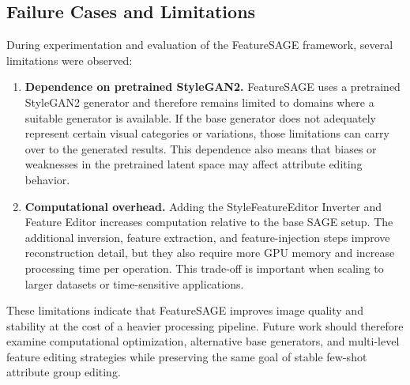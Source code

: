 \subsection{Failure Cases and Limitations}

During experimentation and evaluation of the FeatureSAGE framework, several limitations were observed:

\begin{enumerate}
    \item \textbf{Dependence on pretrained StyleGAN2.} FeatureSAGE uses a pretrained StyleGAN2 generator and therefore remains limited to domains where a suitable generator is available. If the base generator does not adequately represent certain visual categories or variations, those limitations can carry over to the generated results. This dependence also means that biases or weaknesses in the pretrained latent space may affect attribute editing behavior.

    \item \textbf{Computational overhead.} Adding the StyleFeatureEditor Inverter and Feature Editor increases computation relative to the base SAGE setup. The additional inversion, feature extraction, and feature-injection steps improve reconstruction detail, but they also require more GPU memory and increase processing time per operation. This trade-off is important when scaling to larger datasets or time-sensitive applications.
\end{enumerate}

These limitations indicate that FeatureSAGE improves image quality and stability at the cost of a heavier processing pipeline. Future work should therefore examine computational optimization, alternative base generators, and multi-level feature editing strategies while preserving the same goal of stable few-shot attribute group editing.
